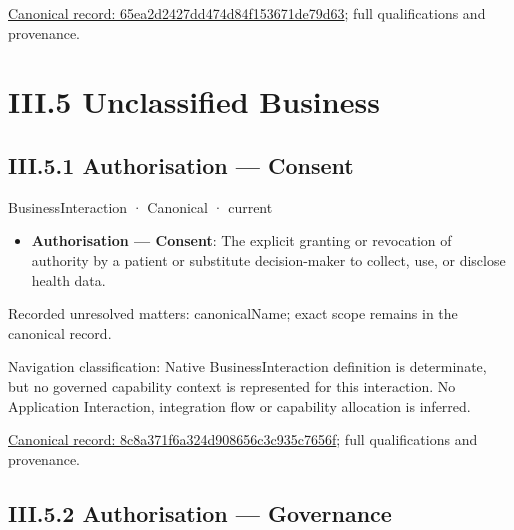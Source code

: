 {\footnotesize \href{../../../../continuum/business/business-function/65ea2d2427dd474d84f153671de79d63.md}{Canonical record: 65ea2d2427dd474d84f153671de79d63}; full qualifications and provenance.}\par
\chapter*{III.5 Unclassified Business}
\label{navigation:III.5}

\section*{III.5.1 Authorisation — Consent}
\label{navigation:III.5.1}

\label{element:8c8a371f6a324d908656c3c935c7656f}
{\small BusinessInteraction · Canonical · current}\par

\begin{itemize}


\item \textbf{Authorisation — Consent}: The explicit granting or revocation of authority by a patient or substitute decision-maker to collect, use, or disclose health data.

\end{itemize}

{\small Recorded unresolved matters: canonicalName; exact scope remains in the canonical record.}\par
{\small Navigation classification: Native BusinessInteraction definition is determinate, but no governed capability context is represented for this interaction. No Application Interaction, integration flow or capability allocation is inferred.}\par
{\footnotesize \href{../../../../continuum/business/business-interaction/8c8a371f6a324d908656c3c935c7656f.md}{Canonical record: 8c8a371f6a324d908656c3c935c7656f}; full qualifications and provenance.}\par
\section*{III.5.2 Authorisation — Governance}
\label{navigation:III.5.2}

